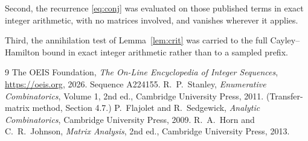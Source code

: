 \documentclass[11pt,a4paper]{article}
\theoremstyle{plain}
\theoremstyle{definition}
\begin{document}
Second, the recurrence \eqref{eq:conj} was evaluated on those published terms in exact
integer arithmetic, with no matrices involved, and vanishes wherever it applies.

Third, the annihilation test of Lemma~\ref{lem:crit} was carried to the full
Cayley--Hamilton bound in exact integer arithmetic rather than to a sampled prefix.

\begin{thebibliography}{9}
 The OEIS Foundation, \emph{The On-Line Encyclopedia of Integer
Sequences}, \url{https://oeis.org}, 2026. Sequence A224155.
 R.~P.~Stanley, \emph{Enumerative Combinatorics}, Volume 1, 2nd ed.,
Cambridge University Press, 2011. (Transfer-matrix method, Section 4.7.)
 P.~Flajolet and R.~Sedgewick, \emph{Analytic Combinatorics}, Cambridge
University Press, 2009.
 R.~A.~Horn and C.~R.~Johnson, \emph{Matrix Analysis}, 2nd ed., Cambridge
University Press, 2013.
\end{thebibliography}
\end{document}
